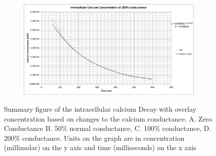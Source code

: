 \documentclass[11pt]{article}
\begin{document}
\begin{figure}[H]
\begin{subfigure}{0.45\textwidth}
		\caption{}
		\label{fig:left}
	\end{subfigure}
	\begin{subfigure}{0.45\textwidth}
		\centering
		\includegraphics[width = \textwidth]{figs/4.png}
		\caption{}
		\label{fig:right}
	\end{subfigure}
	\caption{Summary figure of the intracellular calcium Decay with overlay concentration based on changes to the calcium conductance. A. Zero Conductance B. 50\% normal conductance, C. 100\% conductance, D. 200\% conductance. Units on the graph are in concentration (millimolar) on the y axis and time (milliseconds) on the x axis}
	\label{fig:overlays}
\end{figure}
\end{document}
